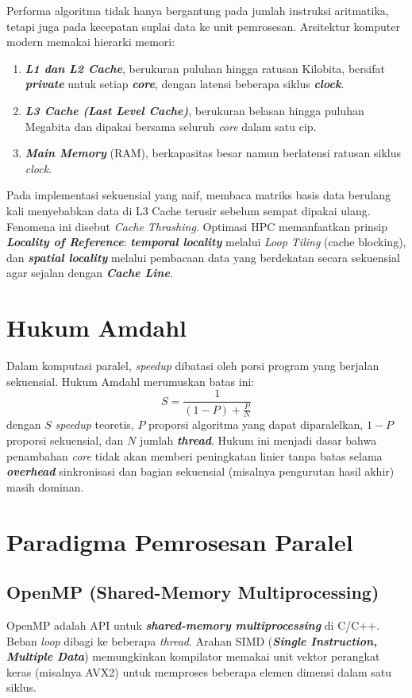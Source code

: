 \documentclass[12pt,a4paper,oneside]{report}
\newcommand{\keyword}[1]{\textbf{\textit{#1}}}
\begin{document}
Performa algoritma tidak hanya bergantung pada jumlah instruksi aritmatika, tetapi juga pada kecepatan suplai data ke unit pemrosesan. Arsitektur komputer modern memakai hierarki memori:
\begin{enumerate}[leftmargin=2em]
  \item \keyword{L1 dan L2 Cache}, berukuran puluhan hingga ratusan Kilobita, bersifat \keyword{private} untuk setiap \keyword{core}, dengan latensi beberapa siklus \keyword{clock}.
  \item \keyword{L3 Cache (Last Level Cache)}, berukuran belasan hingga puluhan Megabita dan dipakai bersama seluruh \textit{core} dalam satu cip.
  \item \keyword{Main Memory} (RAM), berkapasitas besar namun berlatensi ratusan siklus \textit{clock}.
\end{enumerate}

Pada implementasi sekuensial yang naif, membaca matriks basis data berulang kali menyebabkan data di L3 Cache terusir sebelum sempat dipakai ulang. Fenomena ini disebut \textit{Cache Thrashing}. Optimasi HPC memanfaatkan prinsip \keyword{Locality of Reference}: \keyword{temporal locality} melalui \textit{Loop Tiling} (cache blocking), dan \keyword{spatial locality} melalui pembacaan data yang berdekatan secara sekuensial agar sejalan dengan \keyword{Cache Line}.

\section{Hukum Amdahl}

Dalam komputasi paralel, \textit{speedup} dibatasi oleh porsi program yang berjalan sekuensial. Hukum Amdahl merumuskan batas ini:
\begin{equation}
S = \frac{1}{(1 - P) + \frac{P}{N}}
\end{equation}
dengan $S$ \textit{speedup} teoretis, $P$ proporsi algoritma yang dapat diparalelkan, $1-P$ proporsi sekuensial, dan $N$ jumlah \keyword{thread}. Hukum ini menjadi dasar bahwa penambahan \textit{core} tidak akan memberi peningkatan linier tanpa batas selama \keyword{overhead} sinkronisasi dan bagian sekuensial (misalnya pengurutan hasil akhir) masih dominan.

\section{Paradigma Pemrosesan Paralel}

\subsection{OpenMP (Shared-Memory Multiprocessing)}
OpenMP adalah API untuk \keyword{shared-memory multiprocessing} di C/C++. Beban \textit{loop} dibagi ke beberapa \textit{thread}. Arahan SIMD (\keyword{Single Instruction, Multiple Data}) memungkinkan kompilator memakai unit vektor perangkat keras (misalnya AVX2) untuk memproses beberapa elemen dimensi dalam satu siklus.
\end{document}
